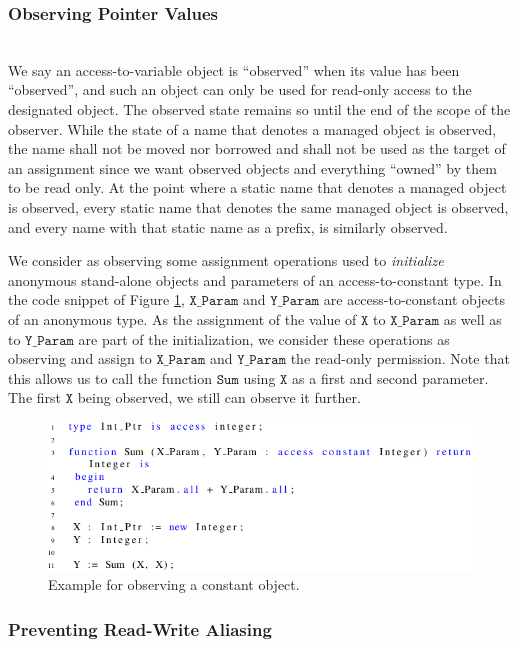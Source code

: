 \documentclass{llncs}
\newcommand\var[1]{\ensuremath{\mathtt{#1}}}
\begin{document}
\subsubsection{Observing Pointer Values}
\label{sec:observing}
\ \\

We say an access-to-variable object is ``observed'' when its value has been ``observed'', and such an object can only be used for read-only access to the designated object.
The observed state remains so until the end of the scope of the observer. While the state of a name that denotes a managed object is observed, the name shall not be moved nor
borrowed and shall not be used as the target of an assignment since we want observed objects and everything ``owned'' by them to be read only. At the point where a static name
that denotes a managed object is observed, every static name that denotes the same managed object is observed, and every name with that static name as a prefix, is similarly observed. 

\smallskip
We consider as observing some assignment operations used to \textit{initialize} anonymous stand-alone objects and parameters of an access-to-constant type.
In the code snippet of Figure \ref{fig:observe_exp}, \var{X\_Param} and \var{Y\_Param} are access-to-constant objects of an anonymous type. As the assignment of the value of \var{X} to \var{X\_Param}
as well as to \var{Y\_Param} are part of the initialization, we consider these operations as observing and assign to \var{X\_Param} and \var{Y\_Param} the read-only permission. Note that
this allows us to call the function \var{Sum} using \var{X} as a first and second parameter. The first \var{X} being observed, we still can observe it further. 

\begin{figure}[htb!]
\centering
   \includegraphics[]{observe_ex1}
   \caption{Example for observing a constant object.}
   \label{fig:observe_exp}
\end{figure}

\subsubsection{Preventing Read-Write Aliasing}
\label{sec:noaliasing}
\ \\
\end{document}
